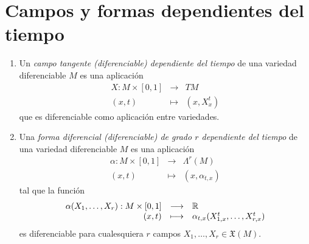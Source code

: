 \section{Campos y formas dependientes del tiempo} \label{sec:tiempo}

  \begin{defn} \leavevmode
    \em
    \begin{enumerate}
      \item Un \emph{campo tangente (diferenciable) dependiente del tiempo} de una variedad diferenciable $M$ es una aplicación \[\begin{array}{rcl}X:M\times[0,1] & \longrightarrow & TM \\ (x,t) & \longmapsto & (x,X^t_x) \end{array} \] que es diferenciable como aplicación entre variedades. 
      \item Una \emph{forma diferencial (diferenciable) de grado $r$ dependiente del tiempo} de una variedad diferenciable $M$ es una aplicación \[\begin{array}{rcl} \alpha: M \times [0,1] & \longrightarrow & \Lambda^r(M) \\ (x,t) &  \longmapsto & (x,\alpha_{t,x}) \end{array}\] tal que la función \[\begin{array}{rcl} \alpha(X_1,\dots,X_r):M\times [0,1] & \longrightarrow & \mathbb{R} \\ (x,t) & \longmapsto & \alpha_{t,x}(X_{1,x}^t,\dots,X_{r,x}^t)\end{array}\] es diferenciable para cualesquiera $r$ campos $X_1,\dots,X_r \in \mathfrak{X}(M)$.
    \end{enumerate}
  \end{defn}

